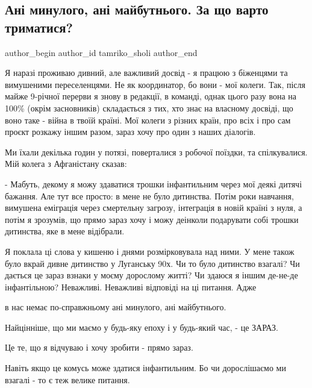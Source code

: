  
 
 
 
 
 
\subsection{Ані минулого, ані майбутнього. За що варто триматися?}
\label{sec:21_11_2022.fb.tamriko_sholi.1.ani_munylogo}
 
\ifcmt
 author_begin
   author_id tamriko_sholi
 author_end
\fi

Я наразі проживаю дивний, але важливий досвід - я працюю з біженцями та
вимушеними переселенцями. Не як координатор, бо вони - мої колеги. Так, після
майже 9-річної перерви я знову в редакції, в команді, однак цього разу вона на
100\% (окрім засновників) складається з тих, хто знає на власному досвіді, що
воно таке - війна в твоїй країні. Мої колеги з різних країн, про всіх і про сам
проєкт розкажу іншим разом, зараз хочу про один з наших діалогів.

Ми їхали декілька годин у потязі, поверталися з робочої поїздки, та
спілкувалися. Мій колега з Афганістану сказав:

- Мабуть, декому я можу здаватися трошки інфантильним через мої деякі дитячі
бажання. Але тут все просто: в мене не було дитинства. Потім роки навчання,
вимушена еміграція через смертельну загрозу, інтеграція в новій країні з нуля,
а потім я зрозумів, що  прямо зараз хочу і можу деінколи подарувати собі трошки
дитинства, яке в мене відібрали.

Я поклала ці слова у кишеню і днями розмірковувала над ними. У мене також було
вкрай дивне дитинство у Луганську 90х. Чи то було дитинство взагалі? Чи дається
це зараз взнаки у моєму дорослому житті? Чи здаюся я іншим де-не-де
інфантільною? Неважливі. Неважливі відповіді на ці питання. Адже

в нас немає по-справжньому ані минулого, ані майбутнього. 

Найцінніше, що ми маємо у будь-яку епоху і у будь-який час, - це ЗАРАЗ.

Це те, що я відчуваю і хочу зробити - прямо зараз. 

Навіть якщо це комусь може здатися інфантильним. Бо чи дорослішаємо ми взагалі
- то є теж велике питання.

